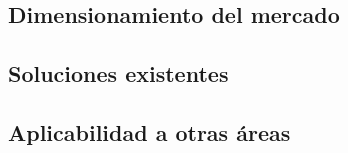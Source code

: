 \subsection{Dimensionamiento del mercado}
\label{sec:mercado}

\subsection{Soluciones existentes}
\label{sec:existentes}

\subsection{Aplicabilidad a otras áreas}





